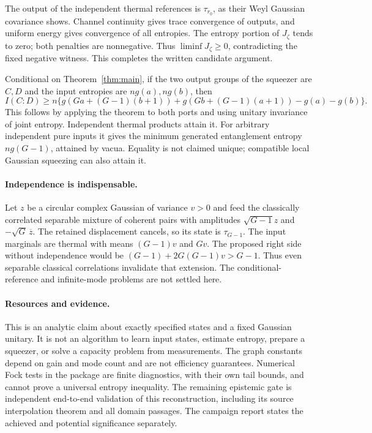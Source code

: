 \documentclass[11pt]{article}
\theoremstyle{remark}\newtheorem{remark}[theorem]{Remark}
\begin{document}
The output of the independent thermal references is $\tau_{r_0}$,
as their Weyl Gaussian covariance shows. Channel continuity gives trace
convergence of outputs, and uniform energy gives convergence of all
entropies. The entropy portion of $J_\zeta$ tends to zero; both penalties
are nonnegative. Thus $\liminf J_\zeta\ge0$, contradicting the fixed
negative witness. This completes the written candidate argument.

Conditional on Theorem~\ref{thm:main}, if the two output groups of the
squeezer are $C,D$ and the input entropies are $ng(a),ng(b)$, then
\[
 I(C:D)\ge n\{g(Ga+(G-1)(b+1))+g(Gb+(G-1)(a+1))-g(a)-g(b)\}.
\]
This follows by applying the theorem to both ports and using unitary
invariance of joint entropy. Independent thermal products attain it.
For arbitrary independent pure inputs it gives the minimum generated
entanglement entropy $ng(G-1)$, attained by vacua. Equality is not claimed
unique; compatible local Gaussian squeezing can also attain it.

\paragraph{Independence is indispensable.}
Let $z$ be a circular complex Gaussian of variance $v>0$ and feed the
classically correlated separable mixture of coherent pairs with amplitudes
$\sqrt{G-1}z$ and $-\sqrt G\,\overline z$. The retained displacement
cancels, so its state is $\tau_{G-1}$. The input marginals are thermal
with means $(G-1)v$ and $Gv$. The proposed right side without independence
would be $(G-1)+2G(G-1)v>G-1$. Thus even separable classical correlations
invalidate that extension. The conditional-reference and infinite-mode
problems are not settled here.

\paragraph{Resources and evidence.}
This is an analytic claim about exactly specified states and a fixed
Gaussian unitary. It is not an algorithm to learn input states, estimate
entropy, prepare a squeezer, or solve a capacity problem from measurements.
The graph constants depend on gain and mode count and are not efficiency
guarantees. Numerical Fock tests in the package are finite diagnostics,
with their own tail bounds, and cannot prove a universal entropy inequality.
The remaining epistemic gate is independent end-to-end validation of this
reconstruction, including its source interpolation theorem and all domain
passages. The campaign report states the achieved and potential
significance separately.
\end{document}
